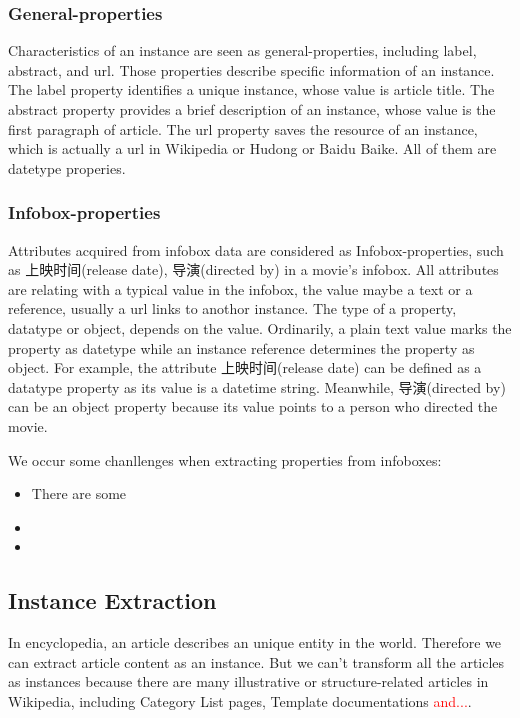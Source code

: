 \documentclass[runningheads,a4paper]{llncs}
\begin{document}
\subsubsection{General-properties}
Characteristics of an instance are seen as general-properties, including label, abstract, and url. Those properties describe specific information of an instance. The label property identifies a unique instance, whose value is article title. The abstract property provides a brief description of an instance, whose value is the first paragraph of article. The url property saves the resource of an instance, which is actually a url in Wikipedia or Hudong or Baidu Baike. All of them are datetype properies.
\subsubsection{Infobox-properties}
Attributes acquired from infobox data are considered as Infobox-properties, such as 上映时间(release date), 导演(directed by) in a movie's infobox. All attributes are relating with a typical value in the infobox, the value maybe a text or a reference, usually a url links to anothor instance. The type of a property, datatype or object, depends on the value. Ordinarily, a plain text value marks the property as datetype while an instance reference determines the property as object. For example, the attribute 上映时间(release date) can be defined as a datatype property as its value is a datetime string. Meanwhile, 导演(directed by) can be an object property because its value points to a person who directed the movie.

We occur some chanllenges when extracting properties from infoboxes:
\begin{itemize}
    \item There are some 
    \item 
    \item 
\end{itemize}

\subsection{Instance Extraction}
\label{sec:ie}
In encyclopedia, an article describes an unique entity in the world. Therefore we can extract article content as an instance. But we can't transform all the articles as instances because there are many illustrative or structure-related articles in Wikipedia, including Category List pages, Template documentations \textcolor{red}{and...}.
\end{document}
